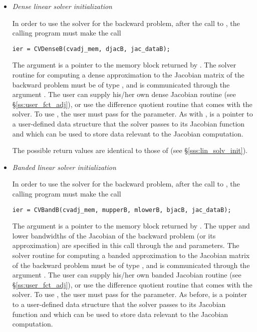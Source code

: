 \begin{itemize}

\item {\em Dense linear solver initialization}

  In order to use the {\cvdense} solver for the backward problem, after the call to 
  , the calling program must make the call
\begin{verbatim}
ier = CVDenseB(cvadj_mem, djacB, jac_dataB);
\end{verbatim}
  The argument  is a pointer to the memory block
  returned by . The {\cvdense} solver routine for computing a
  dense approximation to the Jacobian matrix of the backward problem must be
  of type , and is communicated through the argument
  . The user can supply his/her own dense Jacobian routine
  (see \S\ref{ss:user_fct_adj}), or use the difference quotient routine 
   that comes with the {\cvdense} solver.  To use 
  , the user must pass  for the  parameter.
  As with ,  is a pointer to a user-defined 
  data structure that the {\cvdense} solver passes to its Jacobian function
  and which can be used to store data relevant to the Jacobian computation.
  
  The possible return values  are identical to those of 
  (see \S\ref{sss:lin_solv_init}).

\item {\em Banded linear solver initialization}

  In order to use the {\cvband} solver for the backward problem, after the call to 
  , the calling program must make the call
\begin{verbatim}
ier = CVBandB(cvadj_mem, mupperB, mlowerB, bjacB, jac_dataB);
\end{verbatim}  
  The  argument  is a pointer to the memory block
  returned by . The upper and lower bandwidths of the 
  Jacobian of the backward problem (or its approximation) are specified 
  in this call through the  and  parameters.
  The {\cvband} solver routine for computing a
  banded approximation to the Jacobian matrix of the backward problem must be
  of type , and is communicated through the argument
  . The user can supply his/her own banded Jacobian routine
  (see \S\ref{ss:user_fct_adj}), or use the difference quotient routine 
   that comes with the {\cvband} solver.  To use 
  , the user must pass  for the  parameter.
  As before,  is a pointer to a user-defined 
  data structure that the {\cvband} solver passes to its Jacobian function
  and which can be used to store data relevant to the Jacobian computation.


\end{itemize}

